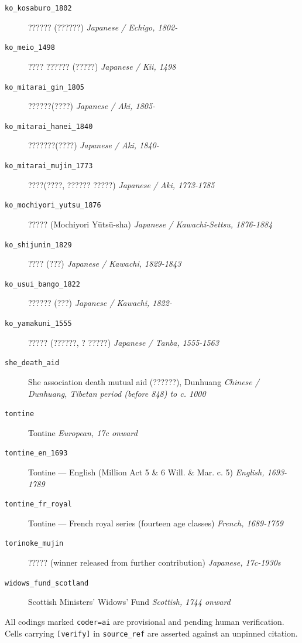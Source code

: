 \documentclass[11pt,a4paper]{article}
\begin{document}
\begin{description}
\item[\texttt{ko\_kosaburo\_1802}] ?????? (??????) \hfill \textit{Japanese / Echigo, 1802-}
\item[\texttt{ko\_meio\_1498}] ???? ?????? (?????) \hfill \textit{Japanese / Kii, 1498}
\item[\texttt{ko\_mitarai\_gin\_1805}] ??????(????) \hfill \textit{Japanese / Aki, 1805-}
\item[\texttt{ko\_mitarai\_hanei\_1840}] ???????(????) \hfill \textit{Japanese / Aki, 1840-}
\item[\texttt{ko\_mitarai\_mujin\_1773}] ????(????, ?????? ?????) \hfill \textit{Japanese / Aki, 1773-1785}
\item[\texttt{ko\_mochiyori\_yutsu\_1876}] ????? (Mochiyori Y\=uts\=u-sha) \hfill \textit{Japanese / Kawachi-Settsu, 1876-1884}
\item[\texttt{ko\_shijunin\_1829}] ???? (???) \hfill \textit{Japanese / Kawachi, 1829-1843}
\item[\texttt{ko\_usui\_bango\_1822}] ?????? (???) \hfill \textit{Japanese / Kawachi, 1822-}
\item[\texttt{ko\_yamakuni\_1555}] ????? (??????, ? ?????) \hfill \textit{Japanese / Tanba, 1555-1563}
\item[\texttt{she\_death\_aid}] She association death mutual aid (??????), Dunhuang \hfill \textit{Chinese / Dunhuang, Tibetan period (before 848) to c. 1000}
\item[\texttt{tontine}] Tontine \hfill \textit{European, 17c onward}
\item[\texttt{tontine\_en\_1693}] Tontine --- English (Million Act 5 \& 6 Will. \& Mar. c. 5) \hfill \textit{English, 1693-1789}
\item[\texttt{tontine\_fr\_royal}] Tontine --- French royal series (fourteen age classes) \hfill \textit{French, 1689-1759}
\item[\texttt{torinoke\_mujin}] ????? (winner released from further contribution) \hfill \textit{Japanese, 17c-1930s}
\item[\texttt{widows\_fund\_scotland}] Scottish Ministers' Widows' Fund \hfill \textit{Scottish, 1744 onward}
\end{description}
\vfill\footnotesize All codings marked \texttt{coder=ai} are provisional and pending human verification. Cells carrying \texttt{[verify]} in \texttt{source\_ref} are asserted against an unpinned citation.
\end{document}
